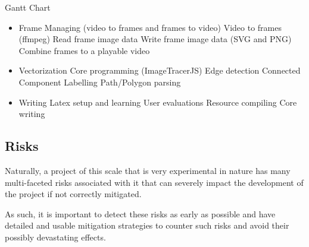 \documentclass[12pt]{article}
\newcommand{\sentence}{} %
\begin{document}
    \pagebreak
    \thispagestyle{empty}
    \begin{landscape}
        \begin{center}
            \huge{Gantt Chart}
            \normalsize
            \begin{itemize}
                \item Frame Managing (video to frames and frames to video)
                \subitem Video to frames (ffmpeg)
                \subitem Read frame image data
                \subitem Write frame image data (SVG and PNG)
                \subitem Combine frames to a playable video
                \item Vectorization
                \subitem Core programming (ImageTracerJS)
                \subitem Edge detection
                \subitem Connected Component Labelling
                \subitem Path/Polygon parsing
                \item Writing
                \subitem Latex setup and learning
                \subitem User evaluations
                \subitem Resource compiling
                \subitem Core writing
            \end{itemize}
        \end{center}
    \end{landscape}
    \pagebreak


    \pagebreak

    \subsection{Risks}\label{subsec:risks}

    \tab
    Naturally, a project of this scale that is very experimental in nature has many multi-faceted risks
    associated with it that can severely impact the development of the project if not correctly mitigated.
    \sentence
    As such, it is important to detect these risks as early as possible and have detailed and usable mitigation
    strategies to counter such risks and avoid their possibly devastating effects.
    \sentence
\end{document}
